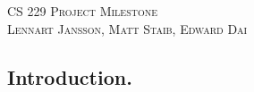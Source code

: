 \documentclass[11pt]{article}
\begin{document}
 
\begin{center}
	\textsc{\Large CS 229 Project Milestone} \\
	\textsc{Lennart Jansson, Matt Staib, Edward Dai}
\end{center}

\subsection*{Introduction.}
\end{document}
